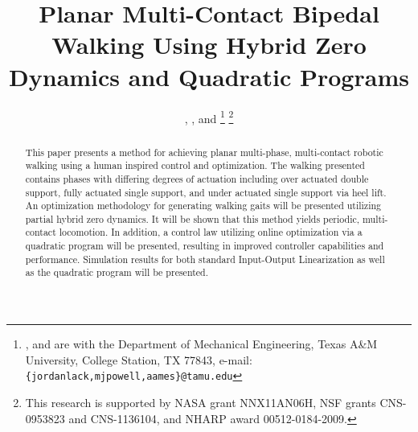 \documentclass[letterpaper, 10 pt, conference]{ieeeconf}  %
\title{\LARGE \bf
Planar Multi-Contact Bipedal Walking Using Hybrid Zero Dynamics and Quadratic Programs
}
\author{\authorone, \authortwo, and \authorthree%
  \thanks{\authorone, \text{\authortwo} and \text{\authorthree} are with the Department of Mechanical Engineering, Texas A\&M University, College Station, TX 77843, e-mail:
    {\tt\small \{jordanlack,mjpowell,aames\}@tamu.edu}}%
    \thanks{This research is supported by NASA grant NNX11AN06H, NSF grants CNS-0953823 and CNS-1136104, and NHARP award 00512-0184-2009.}%
}
\begin{document}
\maketitle
\thispagestyle{empty}
\pagestyle{empty}

\begin{abstract}
This paper presents a method for achieving planar multi-phase, multi-contact robotic walking using a human inspired
control and optimization. The walking presented contains phases with differing degrees of actuation including
over actuated double support, fully actuated single support, and under actuated single support via
heel lift. An optimization methodology for generating walking gaits will be presented utilizing partial hybrid zero dynamics.  It will be shown that this method yields periodic, multi-contact locomotion. In addition, a control law utilizing online optimization via 
a quadratic program will be presented, resulting in improved controller 
capabilities and performance. Simulation results for both standard Input-Output Linearization as well as the quadratic program will be presented.
\end{abstract}










\end{document}
